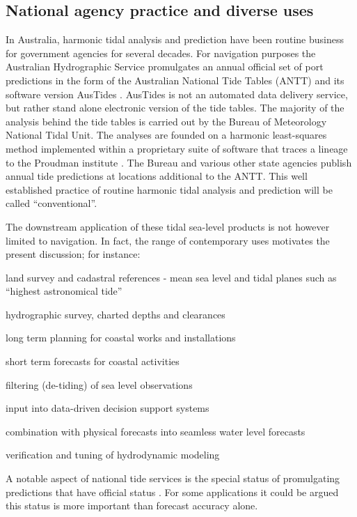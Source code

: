 \subsection{National agency practice and diverse uses}
In Australia, harmonic tidal analysis and prediction have been routine business for government agencies for several decades.  For navigation purposes the Australian Hydrographic Service promulgates an annual official set of port predictions in the form of the Australian National Tide Tables (ANTT) and its software version AusTides \cite{austides}.  AusTides is not an automated data delivery service, but rather stand alone electronic version of the tide tables.  
The majority of the analysis behind the tide tables is carried out by the Bureau of Meteorology National Tidal Unit.  
The analyses are founded on a harmonic least-squares method implemented within a proprietary suite of software that traces a lineage to the Proudman institute \citep{MHL2156}.    
The Bureau and various other state agencies publish annual tide predictions at locations additional to the ANTT. 
This well established practice of routine harmonic tidal analysis and prediction will be called ``conventional''.


The downstream application of these tidal sea-level products is not however limited to navigation.   
In fact, the range of contemporary uses motivates the present discussion; for instance:
\begin{inparaenum}[1)]
    \item land survey and cadastral references - mean sea level and tidal planes such as ``highest astronomical tide'' 
    \item hydrographic survey, charted depths and clearances
    \item long term planning for coastal works and installations
    \item short term forecasts for coastal activities 
    \item filtering (de-tiding) of sea level observations
    \item input into data-driven decision support systems
    \item combination with physical forecasts into seamless water level forecasts 
    \item verification and tuning of hydrodynamic modeling
\end{inparaenum}

A notable aspect of national tide services is the special status of promulgating predictions that have official status \cite{AusNavAct2012}.   For some applications it could be argued this status is more important than forecast accuracy alone.
  

